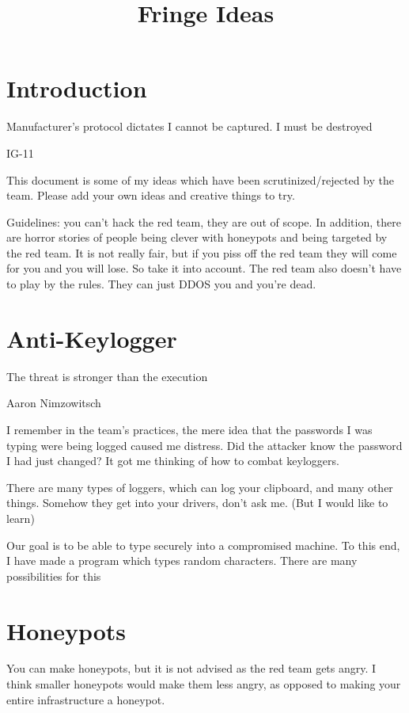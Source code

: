 \documentclass{article}
\title{Fringe Ideas}
\begin{document}
\maketitle

\graphicspath{ {./Images/} }
\tableofcontents

\section{Introduction}
\epigraph{Manufacturer's protocol dictates I cannot be captured. I must be destroyed}{IG-11}

This document is some of my ideas which have been scrutinized/rejected by the team. 
Please add your own ideas and creative things to try.

Guidelines: you can't hack the red team, they are out of scope.
In addition, there are horror stories of people being clever with honeypots and being targeted by the red team.
It is not really fair, but if you piss off the red team they will come for you and you will lose. So take it into account.
The red team also doesn't have to play by the rules. They can just DDOS you and you're dead.

\section{Anti-Keylogger}
\epigraph{The threat is stronger than the execution}{Aaron Nimzowitsch}

I remember in the team's practices, the mere idea that the passwords I was typing were being logged caused me distress. 
Did the attacker know the password I had just changed? It got me thinking of how to combat keyloggers.

There are many types of loggers, which can log your clipboard, and many other things. Somehow they get into your drivers, don't ask me. (But I would like to learn)

Our goal is to be able to type securely into a compromised machine. To this end, I have made a program which types random characters. There are many possibilities for this

\section{Honeypots}
You can make honeypots, but it is not advised as the red team gets angry. 
I think smaller honeypots would make them less angry, as opposed to making 
your entire infrastructure a honeypot.
\end{document}
